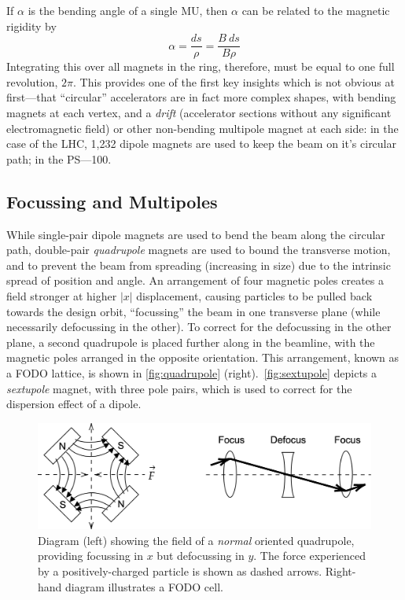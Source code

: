 \documentclass[11pt]{report}
\begin{document}
If $\alpha$ is the bending angle of a single MU, then $\alpha$ can be related to the magnetic rigidity by
\begin{equation}
\alpha=\frac{ds}\rho=\frac{B\ ds}{B\rho}
\end{equation}
Integrating this over all magnets in the ring, therefore, must be equal to one full revolution, $2\pi$. This provides one of the first key insights which is not obvious at first---that ``circular'' accelerators are in fact more complex shapes, with bending magnets at each vertex, and a \textit{drift} (accelerator sections without any significant electromagnetic field) or other non-bending multipole magnet at each side: in the case of the LHC, 1,232 dipole magnets are used to keep the beam on it's circular path; in the PS---100.

\subsection{Focussing and Multipoles}

While single-pair dipole magnets are used to bend the beam along the circular path, double-pair \textit{quadrupole} magnets are used to bound the transverse motion, and to prevent the beam from spreading (increasing in size) due to the intrinsic spread of position and angle. An arrangement of four magnetic poles creates a field stronger at higher $|x|$ displacement, causing particles to be pulled back towards the design orbit, ``focussing'' the beam in one transverse plane (while necessarily defocussing in the other). To correct for the defocussing in the other plane, a second quadrupole is placed further along in the beamline, with the magnetic poles arranged in the opposite orientation. This arrangement, known as a FODO lattice, is shown in \autoref{fig:quadrupole} (right).~\autoref{fig:sextupole} depicts a \textit{sextupole} magnet, with three pole pairs, which is used to correct for the dispersion effect of a dipole. %

\begin{figure}
\centering
  \includegraphics*[width=0.9\linewidth]{fodo.png}
  \caption{Diagram (left) showing the field of a \textit{normal} oriented quadrupole, providing focussing in $x$ but defocussing in $y$. The force experienced by a positively-charged particle is shown as dashed arrows. Right-hand diagram illustrates a FODO cell.}\label{fig:quadrupole}
\end{figure}
\end{document}
